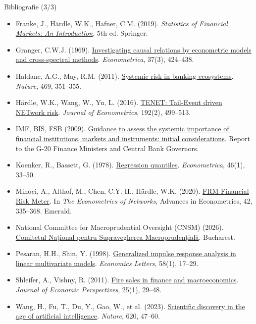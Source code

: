 \begin{frame}{Bibliografie (3/3)}
\itemsize{\tiny}
\begin{itemize}
    \item Franke, J., Härdle, W.K., Hafner, C.M. (2019). \href{https://doi.org/10.1007/978-3-030-13751-9}{\textit{Statistics of Financial Markets: An Introduction}}, 5th ed. Springer.
    \item Granger, C.W.J. (1969). \href{https://doi.org/10.2307/1912791}{Investigating causal relations by econometric models and cross-spectral methods}. \textit{Econometrica}, 37(3), 424--438.
    \item Haldane, A.G., May, R.M. (2011). \href{https://doi.org/10.1038/nature09659}{Systemic risk in banking ecosystems}. \textit{Nature}, 469, 351--355.
    \item Härdle, W.K., Wang, W., Yu, L. (2016). \href{https://doi.org/10.1016/j.jeconom.2016.02.013}{TENET: Tail-Event driven NETwork risk}. \textit{Journal of Econometrics}, 192(2), 499--513.
    \item IMF, BIS, FSB (2009). \href{https://www.bis.org/publ/othp07.htm}{Guidance to assess the systemic importance of financial institutions, markets and instruments: initial considerations}. Report to the G-20 Finance Ministers and Central Bank Governors.
    \item Koenker, R., Bassett, G. (1978). \href{https://doi.org/10.2307/1913643}{Regression quantiles}. \textit{Econometrica}, 46(1), 33--50.
    \item Mihoci, A., Althof, M., Chen, C.Y.-H., Härdle, W.K. (2020). \href{https://doi.org/10.1108/s0731-905320200000042016}{FRM Financial Risk Meter}. In \textit{The Econometrics of Networks}, Advances in Econometrics, 42, 335--368. Emerald.
    \item National Committee for Macroprudential Oversight (CNSM) (2026). \href{https://www.cnsmro.ro/}{Comitetul Național pentru Supravegherea Macroprudențială}. Bucharest.
    \item Pesaran, H.H., Shin, Y. (1998). \href{https://doi.org/10.1016/S0165-1765(97)00214-0}{Generalized impulse response analysis in linear multivariate models}. \textit{Economics Letters}, 58(1), 17--29.
    \item Shleifer, A., Vishny, R. (2011). \href{https://doi.org/10.1257/jep.25.1.29}{Fire sales in finance and macroeconomics}. \textit{Journal of Economic Perspectives}, 25(1), 29--48.
    \item Wang, H., Fu, T., Du, Y., Gao, W., et al. (2023). \href{https://doi.org/10.1038/s41586-023-06221-2}{Scientific discovery in the age of artificial intelligence}. \textit{Nature}, 620, 47--60.
\end{itemize}
\end{frame}


